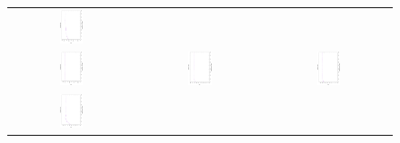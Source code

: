 \begin{figure}[h]
\begin{tabular}{ccc}
   \includegraphics[width=0.2\textwidth,angle=-90,origin=c]{Figures_Chapter7/Results_Chapter3/EPS_DI/UF6.eps}
   \\
  \includegraphics[width=0.2\textwidth, angle=-90,origin=c]{Figures_Chapter7/Results_Chapter3/EPS_DI/UF7.eps} &
   \includegraphics[width=0.2\textwidth, angle=-90,origin=c]{Figures_Chapter7/Results_Chapter3/EPS_DI/UF8.eps} &
   \includegraphics[width=0.2\textwidth,angle=-90,origin=c]{Figures_Chapter7/Results_Chapter3/EPS_DI/UF9.eps}
   \\
   \includegraphics[width=0.2\textwidth,angle=-90,origin=c]{Figures_Chapter7/Results_Chapter3/EPS_DI/UF10.eps}
\end{tabular}
\end{figure}

